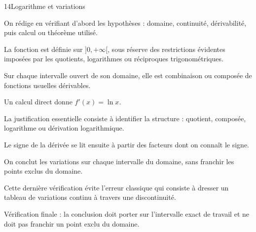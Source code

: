 \documentclass[11pt,a4paper]{article}
\begin{document}
\begin{corrbox}{14}{Logarithme et variations}

\begin{methodebox}
On rédige en vérifiant d'abord les hypothèses : domaine, continuité, dérivabilité, puis calcul ou théorème utilisé.
\end{methodebox}

La fonction est définie sur $]0,+\infty[$, sous réserve des restrictions évidentes imposées par les quotients, logarithmes ou réciproques trigonométriques.


Sur chaque intervalle ouvert de son domaine, elle est combinaison ou composée de fonctions usuelles dérivables.


Un calcul direct donne $f'(x)=\ln x$.


La justification essentielle consiste à identifier la structure : quotient, composée, logarithme ou dérivation logarithmique.


Le signe de la dérivée se lit ensuite à partir des facteurs dont on connaît le signe.


On conclut les variations sur chaque intervalle du domaine, sans franchir les points exclus du domaine.


Cette dernière vérification évite l'erreur classique qui consiste à dresser un tableau de variations continu à travers une discontinuité.


\begin{attentionbox}
Vérification finale : la conclusion doit porter sur l'intervalle exact de travail et ne doit pas franchir un point exclu du domaine.
\end{attentionbox}

\end{corrbox}
\end{document}
